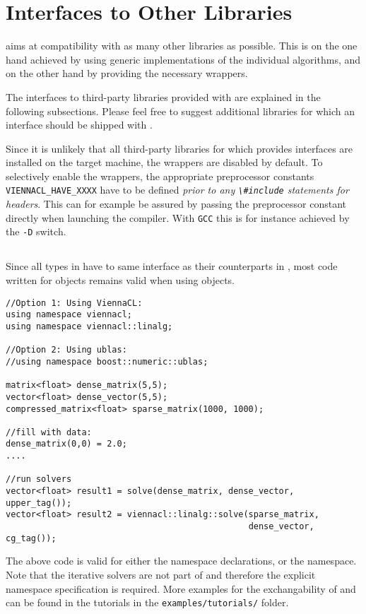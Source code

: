 \chapter{Interfaces to Other Libraries} \label{chap:other-libs}
{\ViennaCL} aims at compatibility with as many other libraries as possible.
This is on the one hand achieved by using generic implementations of the individual algorithms,
and on the other hand by providing the necessary wrappers.

The interfaces to third-party libraries provided with {\ViennaCL} are explained in the following subsections.
Please feel free to suggest additional libraries for which an interface should be shipped with {\ViennaCL}.

Since it is unlikely that all third-party libraries for which {\ViennaCL} provides interfaces are installed
on the target machine, the wrappers are disabled by default. To selectively enable the wrappers,
the appropriate preprocessor constants \lstinline|VIENNACL_HAVE_XXXX| have to be defined \emph{prior to any 
\lstinline|\#include| statements for {\ViennaCL} headers}. This can for example be assured by passing the
preprocessor constant directly when launching the compiler. With \lstinline|GCC| this is for instance 
achieved by the \lstinline|-D| switch.

\section{\ublas}
Since all types in {\ViennaCL} have to same interface as their counterparts in {\ublas},
most code written for {\ViennaCL} objects remains valid when using {\ublas} objects.
\begin{lstlisting}
//Option 1: Using ViennaCL:
using namespace viennacl;
using namespace viennacl::linalg;

//Option 2: Using ublas:
//using namespace boost::numeric::ublas;

matrix<float> dense_matrix(5,5);
vector<float> dense_vector(5,5);
compressed_matrix<float> sparse_matrix(1000, 1000);

//fill with data:
dense_matrix(0,0) = 2.0;
....

//run solvers
vector<float> result1 = solve(dense_matrix, dense_vector, upper_tag());
vector<float> result2 = viennacl::linalg::solve(sparse_matrix,
                                                dense_vector, cg_tag());
\end{lstlisting}
The above code is valid for either the {\ViennaCL} namespace declarations, or the {\ublas} namespace. Note that the
iterative solvers are not part of {\ublas} and therefore the explicit namespace specification is required. More examples
for the exchangability of {\ublas} and {\ViennaCL} can be found in the tutorials in the \texttt{examples/tutorials/} folder.

